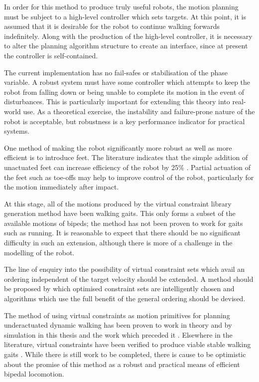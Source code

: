 In order for this method to produce truly useful robots, the motion planning must be subject to a high-level controller which sets targets. At this point, it is assumed that it is desirable for the robot to continue walking forwards indefinitely. Along with the production of the high-level controller, it is necessary to alter the planning algorithm structure to create an interface, since at present the controller is self-contained.

The current implementation has no fail-safes or stabilisation of the phase variable. A robust system must have some controller which attempts to keep the robot from falling down or being unable to complete its motion in the event of disturbances. This is particularly important for extending this theory into real-world use. As a theoretical exercise, the instability and failure-prone nature of the robot is acceptable, but robustness is a key performance indicator for practical systems.

One method of making the robot significantly more robust as well as more efficient is to introduce feet. The literature indicates that the simple addition of unactuated feet can increase efficiency of the robot by 25\% \cite{asano2007dynamic}. Partial actuation of the feet such as toe-offs may help to improve control of the robot, particularly for the motion immediately after impact.

At this stage, all of the motions produced by the virtual constraint library generation method have been walking gaits. This only forms a subset of the available motions of bipeds; the method has not been proven to work for gaits such as running. It is reasonable to expect that there should be no significant difficulty in such an extension, although there is more of a challenge in the modelling of the robot.

The line of enquiry into the possibility of virtual constraint sets which avail an ordering independent of the target velocity should be extended. A method should be proposed by which optimised constraint sets are intelligently chosen and algorithms which use the full benefit of the general ordering should be devised.

The method of using virtual constraints as motion primitives for planning underactuated dynamic walking has been proven to work in theory and by simulation in this thesis and the work which preceded it \cite{manchester13planning}. Elsewhere in the literature, virtual constraints have been verified to produce viable stable walking gaits \cite{byl2008approximate, sreenath2011compliant}. While there is still work to be completed, there is cause to be optimistic about the promise of this method as a robust and practical means of efficient bipedal locomotion.